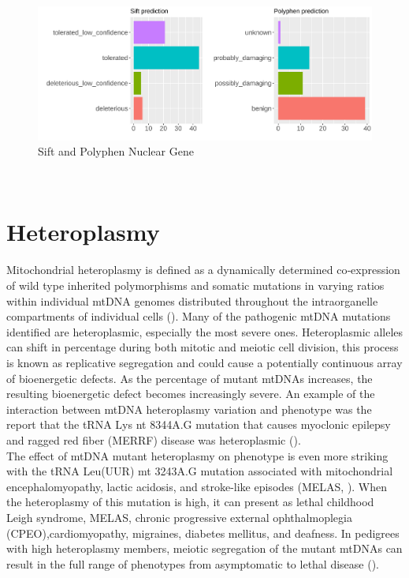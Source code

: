 \begin{figure}[H]
\includegraphics[width=1\textwidth]{Fig/nuclear_SiftPoly.png}
\caption{Sift and Polyphen Nuclear Gene}
\label{fig:siftpolyphen_nuclear}
\end{figure}\\



\newpage
\section{Heteroplasmy}

Mitochondrial heteroplasmy is defined as a dynamically determined co‐expression of wild type inherited polymorphisms and somatic mutations in varying ratios within individual mtDNA genomes distributed throughout the intraorganelle compartments of individual cells (\cite{stefano2016mitochondrial}).
Many of the pathogenic mtDNA mutations identified are heteroplasmic, especially the most severe ones. Heteroplasmic alleles can shift in percentage during both mitotic and meiotic cell division, this process is known as replicative segregation and could cause a potentially continuous array of bioenergetic defects. As the percentage of mutant mtDNAs increases, the resulting bioenergetic defect becomes increasingly severe. An example of the interaction between mtDNA heteroplasmy variation and phenotype was the report that the tRNA Lys nt 8344A.G  mutation that causes myoclonic epilepsy and ragged red fiber (MERRF) disease was heteroplasmic (\cite{wallace2013mitochondrial}). \\
The effect of mtDNA mutant heteroplasmy on phenotype is even more striking with the tRNA Leu(UUR) mt 3243A.G mutation associated with mitochondrial encephalomyopathy, lactic acidosis, and stroke-like episodes (MELAS, \cite{goto2011dynamics}). When the heteroplasmy of this mutation is high, it can present as lethal childhood Leigh syndrome, MELAS, chronic progressive external ophthalmoplegia (CPEO),cardiomyopathy, migraines, diabetes mellitus, and deafness. In pedigrees with high heteroplasmy members, meiotic segregation of the mutant mtDNAs can result in the full range of phenotypes from asymptomatic to lethal disease (\cite{wallace2013mitochondrial}).\\


